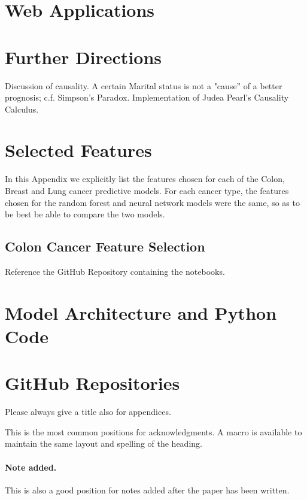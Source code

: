 \documentclass[a4paper,11pt]{article}
\begin{document}
\section{Web Applications}



\section{Further Directions}

Discussion of causality. A certain Marital status is not a "cause'' of a better prognosis; c.f. Simpson's Paradox. Implementation of Judea Pearl's Causality Calculus.


\appendix
\section{Selected Features}
\label{sec:features}
In this Appendix we explicitly list the features chosen for each of the Colon, Breast and Lung cancer predictive models. For each cancer type, the features chosen for the random forest and neural network models were the same, so as to be best be able to compare the two models.

\subsection{Colon Cancer Feature Selection}

Reference the GitHub Repository containing the notebooks.



\section{Model Architecture and Python Code}
\section{GitHub Repositories}
Please always give a title also for appendices.





\acknowledgments

This is the most common positions for acknowledgments. A macro is
available to maintain the same layout and spelling of the heading.

\paragraph{Note added.} This is also a good position for notes added
after the paper has been written.
\end{document}
